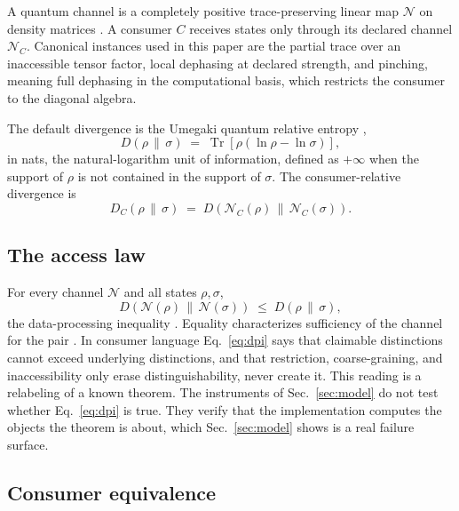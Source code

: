 \documentclass[aps,prd,reprint,nofootinbib,longbibliography]{revtex4-2}
\newcommand{\Tr}{\operatorname{Tr}}
\newcommand{\Nc}{\mathcal{N}}
\begin{document}
A quantum channel is a completely positive trace-preserving linear map
$\Nc$ on density matrices \cite{NielsenChuang}.  A consumer $C$ receives
states only through its declared channel $\Nc_C$.  Canonical instances used
in this paper are the partial trace over an inaccessible tensor factor, local
dephasing at declared strength, and pinching, meaning full dephasing in the
computational basis, which restricts the consumer to the diagonal algebra.

The default divergence is the Umegaki quantum relative entropy
\cite{Umegaki1962},
\begin{equation}
D(\rho\,\|\,\sigma) \;=\; \Tr\!\left[\rho\left(\ln\rho-\ln\sigma\right)\right],
\label{eq:umegaki}
\end{equation}
in nats, the natural-logarithm unit of information, defined as $+\infty$
when the support of $\rho$ is not contained in the support of $\sigma$.  The consumer-relative divergence is
\begin{equation}
D_C(\rho\,\|\,\sigma) \;=\; D\!\left(\Nc_C(\rho)\,\|\,\Nc_C(\sigma)\right).
\label{eq:dc}
\end{equation}

\subsection{The access law}

For every channel $\Nc$ and all states $\rho,\sigma$,
\begin{equation}
D\!\left(\Nc(\rho)\,\|\,\Nc(\sigma)\right) \;\le\; D(\rho\,\|\,\sigma),
\label{eq:dpi}
\end{equation}
the data-processing inequality \cite{Lindblad1975}.  Equality
characterizes sufficiency of the channel for the pair \cite{Petz1986}.  In
consumer language Eq.~\eqref{eq:dpi} says that claimable distinctions cannot
exceed underlying distinctions, and that restriction, coarse-graining, and
inaccessibility only erase distinguishability, never create it.  This
reading is a relabeling of a known theorem.  The instruments of
Sec.~\ref{sec:model} do not test whether Eq.~\eqref{eq:dpi} is true.  They
verify that the implementation computes the objects the theorem is about,
which Sec.~\ref{sec:model} shows is a real failure surface.

\subsection{Consumer equivalence}
\end{document}
